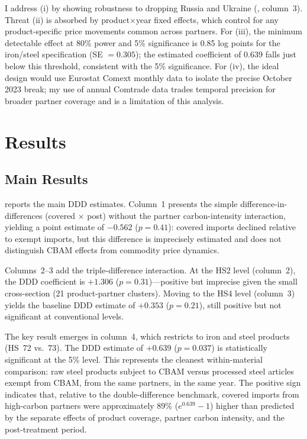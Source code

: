 \documentclass[12pt]{article}
\begin{document}
I address (i) by showing robustness to dropping Russia and Ukraine (, column~3). Threat (ii) is absorbed by product$\times$year fixed effects, which control for any product-specific price movements common across partners. For (iii), the minimum detectable effect at 80\% power and 5\% significance is 0.85 log points for the iron/steel specification (SE $= 0.305$); the estimated coefficient of 0.639 falls just below this threshold, consistent with the 5\% significance. For (iv), the ideal design would use Eurostat Comext monthly data to isolate the precise October 2023 break; my use of annual Comtrade data trades temporal precision for broader partner coverage and is a limitation of this analysis.


\section{Results}
\label{sec:results}

\subsection{Main Results}

 reports the main DDD estimates. Column~1 presents the simple difference-in-differences (covered $\times$ post) without the partner carbon-intensity interaction, yielding a point estimate of $-0.562$ ($p = 0.41$): covered imports declined relative to exempt imports, but this difference is imprecisely estimated and does not distinguish CBAM effects from commodity price dynamics.

Columns~2--3 add the triple-difference interaction. At the HS2 level (column~2), the DDD coefficient is $+1.306$ ($p = 0.31$)---positive but imprecise given the small cross-section (21 product-partner clusters). Moving to the HS4 level (column~3) yields the baseline DDD estimate of $+0.353$ ($p = 0.21$), still positive but not significant at conventional levels.

The key result emerges in column~4, which restricts to iron and steel products (HS~72 vs.~73). The DDD estimate of $+0.639$ ($p = 0.037$) is statistically significant at the 5\% level. This represents the cleanest within-material comparison: raw steel products subject to CBAM versus processed steel articles exempt from CBAM, from the same partners, in the same year. The positive sign indicates that, relative to the double-difference benchmark, covered imports from high-carbon partners were approximately 89\% ($e^{0.639} - 1$) higher than predicted by the separate effects of product coverage, partner carbon intensity, and the post-treatment period.
\end{document}
